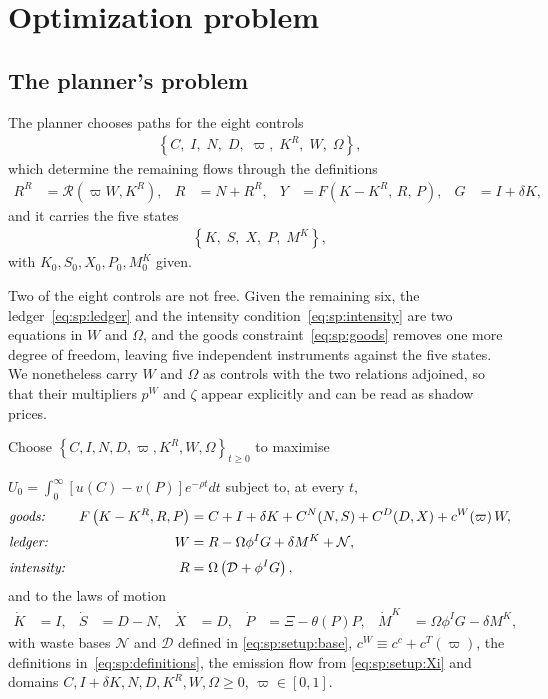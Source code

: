 ﻿\section{Optimization problem}\label{sec:sp:opt}

\subsection{The planner's problem}\label{sec:sp:opt:problem}

 The planner chooses paths for the eight controls
\begin{align}
    \left\{C,\;I,\;N,\;D,\;\varpi,\;K^R,\;W,\;\Omega\right\},
\label{eq:sp:controls}
\end{align}
which determine the remaining flows through the definitions
\begin{align}
R^R &= \mathcal R\left(\varpi W,K^R\right),
&
R &= N+R^R,
&
Y &= F\left(K-K^R,\,R,\,P\right),
&
G &= I+\delta K,
\label{eq:sp:definitions}
\end{align}
and it carries the five states
\begin{align}
\left\{K,\;S,\;X,\;P,\;M^K\right\},
\label{eq:sp:states}
\end{align}
with $K_0,S_0,X_0,P_0,M^K_0$ given.

Two of the eight controls are not free. Given the remaining six, the ledger~\eqref{eq:sp:ledger} and the intensity condition~\eqref{eq:sp:intensity} are two equations in $W$ and $\Omega$, and the goods constraint~\eqref{eq:sp:goods} removes one more degree of freedom, leaving five independent instruments against the five states. We nonetheless carry $W$ and $\Omega$ as controls with the two relations adjoined, so that their multipliers $p^W$ and $\zeta$ appear explicitly and can be read as shadow prices.


\begin{problem}\label{prob:sp}
Choose $\left\{C,I,N,D,\varpi,K^R,W,\Omega\right\}_{t\ge0}$ to maximise

\noindent $U_0=\int_0^\infty\left[u(C)-v(P)\right]e^{-\rho t}dt$ subject to, at every $t$,
\begin{align}
&\text{\emph{goods:}}
&
F\left(K-K^R,R,P\right) &= C+I+\delta K+C^N(N,S)+C^D(D,X)+c^W\!\left(\varpi\right)W,
\label{eq:sp:goods}
\\[0.2em]
&\text{\emph{ledger:}}
&
W &= R-\Omega\phi^I G+\delta M^K+\mathcal N,
\label{eq:sp:ledger}
\\[0.2em]
&\text{\emph{intensity:}}
&
R &= \Omega\left(\mathcal D+\phi^IG\right),
\label{eq:sp:intensity}
\end{align}
and to the laws of motion
\begin{align}
\dot K &= I,
&
\dot S &= D-N,
&
\dot X &= D,
&
\dot P &= \Xi-\theta(P)P,
&
\dot M^K &= \Omega\phi^I G-\delta M^K,
\label{eq:sp:states-motion}
\end{align}
with waste bases $\mathcal{N}$ and $\mathcal{D}$ defined in \eqref{eq:sp:setup:base}, $c^W \equiv c^c+ c^T(\varpi)$, the definitions in~\eqref{eq:sp:definitions}, the emission flow from \eqref{eq:sp:setup:Xi} and domains $C,I+\delta K,N,D,K^R,W,\Omega\ge0$, $\varpi\in\left[0,1\right]$.
\end{problem}

